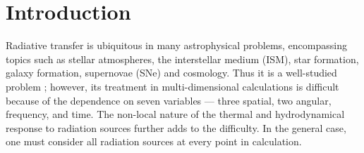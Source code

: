 \documentclass[apj,onecolumn]{emulateapj}
\begin{document}

\section{Introduction}

Radiative transfer is ubiquitous in many astrophysical problems,
encompassing topics such as stellar atmospheres, the interstellar
medium (ISM), star formation, galaxy formation, supernovae (SNe) and
cosmology.  Thus it is a well-studied problem
\citep[e.g.][]{Mathews65, Rybicki, Mihalas84, Yorke86}; however, its
treatment in multi-dimensional calculations is difficult because of
the dependence on seven variables --- three spatial, two angular,
frequency, and time.  The non-local nature of the thermal and
hydrodynamical response to radiation sources further adds to the
difficulty.  In the general case, one must consider all radiation
sources at every point in calculation.  
\end{document}
